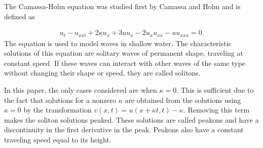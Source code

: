 The Camassa-Holm equation was studied first by Camassa and Holm \cite{camassa1993integrable} and is defined as

\begin{align}
u_{t} - u_{xxt} + 2\kappa u_{x} + 3uu_{x} - 2u_{x}u_{xx} - uu_{xxx} = 0.
\end{align}
The equation is used to model waves in shallow water. The characteristic solutions of this equation are solitary waves of permanent shape, traveling at constant speed. If these waves can interact with other waves of the same type without changing their shape or speed, they are called solitons. 

In this paper, the only cases considered are when $\kappa = 0$. This is sufficient due to the fact that solutions for a nonzero $\kappa$ are obtained from the solutions using $\kappa = 0$ by the transformation $v(x,t) = u(x + \kappa t, t) - \kappa$. Removing this term makes the soliton solutions peaked. These solutions are called peakons and have a discontinuity in the first derivative in the peak. Peakons also have a constant traveling speed equal to its height.

